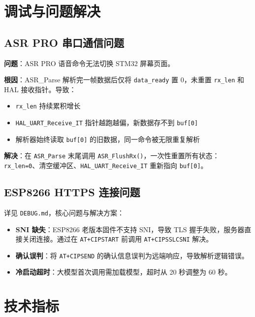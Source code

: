 \documentclass[12pt,a4paper]{ctexart}
\begin{document}
\section{调试与问题解决}

\subsection{ASR PRO 串口通信问题}

\textbf{问题}：ASR PRO 语音命令无法切换 STM32 屏幕页面。

\textbf{根因}：ASR\_Parse 解析完一帧数据后仅将 \texttt{data\_ready} 置 0，未重置 \texttt{rx\_len} 和 HAL 接收指针。导致：
\begin{itemize}
    \item \texttt{rx\_len} 持续累积增长
    \item \texttt{HAL\_UART\_Receive\_IT} 指针越跑越偏，新数据存不到 \texttt{buf[0]}
    \item 解析器始终读取 \texttt{buf[0]} 的旧数据，同一命令被无限重复解析
\end{itemize}

\textbf{解决}：在 \texttt{ASR\_Parse} 末尾调用 \texttt{ASR\_FlushRx()}，一次性重置所有状态：\texttt{rx\_len=0}、清空缓冲区、\texttt{HAL\_UART\_Receive\_IT} 重新指向 \texttt{buf[0]}。

\subsection{ESP8266 HTTPS 连接问题}

详见 \texttt{DEBUG.md}，核心问题与解决方案：
\begin{itemize}
    \item \textbf{SNI 缺失}：ESP8266 老版本固件不支持 SNI，导致 TLS 握手失败，服务器直接关闭连接。通过在 \texttt{AT+CIPSTART} 前调用 \texttt{AT+CIPSSLCSNI} 解决。
    \item \textbf{确认误判}：将 \texttt{AT+CIPSEND} 的确认信息误判为远端响应，导致解析逻辑错误。
    \item \textbf{冷启动超时}：大模型首次调用需加载模型，超时从 20 秒调整为 60 秒。
\end{itemize}


\section{技术指标}
\end{document}
